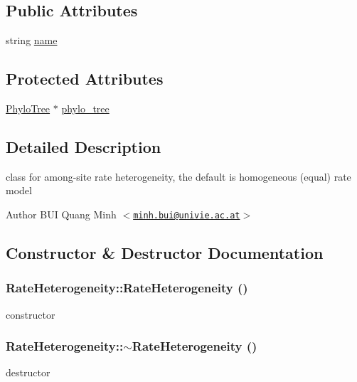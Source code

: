\subsection*{Public Attributes}
\begin{DoxyCompactItemize}
\item 
string \hyperlink{classRateHeterogeneity_aec54d9090abff011fb0c437d51b1d759}{name}
\end{DoxyCompactItemize}
\subsection*{Protected Attributes}
\begin{DoxyCompactItemize}
\item 
\hyperlink{classPhyloTree}{PhyloTree} $\ast$ \hyperlink{classRateHeterogeneity_a15901cd491ded27a2d8cd4ddb731e647}{phylo\_\-tree}
\end{DoxyCompactItemize}


\subsection{Detailed Description}
class for among-\/site rate heterogeneity, the default is homogeneous (equal) rate model

\begin{DoxyAuthor}{Author}
BUI Quang Minh $<$\href{mailto:minh.bui@univie.ac.at}{\tt minh.bui@univie.ac.at}$>$ 
\end{DoxyAuthor}


\subsection{Constructor \& Destructor Documentation}
\hypertarget{classRateHeterogeneity_a9a1e70b493cfd7ce53bfbce242bbcb46}{
\subsubsection[{RateHeterogeneity}]{\setlength{\rightskip}{0pt plus 5cm}RateHeterogeneity::RateHeterogeneity ()}}
\label{classRateHeterogeneity_a9a1e70b493cfd7ce53bfbce242bbcb46}
constructor \hypertarget{classRateHeterogeneity_a695587b35c973b88c6d669dd00ffd791}{
\subsubsection[{$\sim$RateHeterogeneity}]{\setlength{\rightskip}{0pt plus 5cm}RateHeterogeneity::$\sim$RateHeterogeneity ()}}
\label{classRateHeterogeneity_a695587b35c973b88c6d669dd00ffd791}
destructor 

